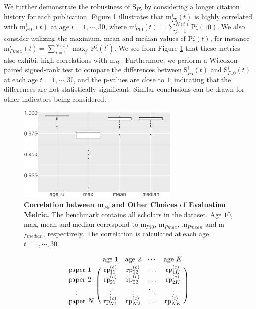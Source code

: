 \begin{refsection}
We further demonstrate the robustness of S$_{P5}$ by considering a longer citation history for each publication. Figure \ref{fig:robustness_test_cor} illustrates that m$_{P5}^{i}(t)$ is highly correlated with m$_{P10}^{i}(t)$ at age $t=1,\cdots,30$, where m$_{P10}^{i}(t)= \sum_{j=1}^{N(t)} \text{P}_{c}^{j}(10)$. We also consider utilizing the maximum, mean and median values of P$_{c}^{j}(t)$, for instance m$_{Pmax}^{i}(t)= \sum_{j=1}^{N(t)} \max_{t^\prime}\text{P}_{c}^{j}(t^\prime)$. We see from Figure \ref{fig:robustness_test_cor} that these metrics also exhibit high correlations with m$_{P5}$. Furthermore, we perform a Wilcoxon paired signed-rank test to compare the differences between S$_{P5}^{i}(t)$ and S$_{P10}^{i}(t)$ at each age $t=1,\cdots,30$, and the p-values are close to $1$; indicating that the differences are not statistically significant. Similar conclusions can be drawn for other indicators being considered.

\begin{figure}[ht!]
    \centering
    \includegraphics[width=0.7\textwidth]{figures/robustness/cor.eps}
    \caption{{\bf Correlation between m$_{P5}$ and Other Choices of Evaluation Metric.}
    The benchmark contains all scholars in the dataset. Age $10$, max, mean and median correspond to m$_{P10}$, m$_{Pmax}$, m$_{Pmean}$ and m$_{Pmedian}$, respectively. The correlation is calculated at each age $t=1,\cdots,30$.}
    \label{fig:robustness_test_cor}
\end{figure}


\iffalse
\begin{equation}
\label{eq:rp_matrix}
\bordermatrix{
    & \text{age 1}     & \text{age 2}     & \cdots & \text{age $K$}     \cr
    \text{paper 1}     & \text{rp}_{11}^{(c)}     & \text{rp}_{12}^{(c)}     & \ldots & \text{rp}_{1 K}^{(c)}      \cr
    \text{paper 2}     & \text{rp}_{21}^{(c)}     & \text{rp}_{22}^{(c)}    & \ldots & \text{rp}_{2 K}^{(c)}     \cr
    \quad \vdots & \vdots & \vdots & \ddots & \vdots \cr
    \text{paper $N$}     & \text{rp}_{N 1}^{(c)}     & \text{rp}_{N 2}^{(c)}     & \ldots  & \text{rp}_{N K}^{(c)}    \cr
}
\end{equation}


\end{refsection}
